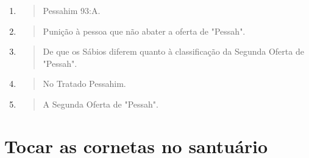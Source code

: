 \begin{enumerate}
\def\labelenumi{\arabic{enumi}.}
\setcounter{enumi}{77}
\item
 \begin{quote}
 Pessahim 93:A.
 \end{quote}
\item
 \begin{quote}
 Punição à pessoa que não abater a oferta de "Pessah".
 \end{quote}
\item
 \begin{quote}
 De que os Sábios diferem quanto à classificação da Segunda Oferta de
 "Pessah".
 \end{quote}
\item
 \begin{quote}
 No Tratado Pessahim.
 \end{quote}
\item
 \begin{quote}
 A Segunda Oferta de "Pessah".
 \end{quote}
\end{enumerate}


\section{Tocar as cornetas no santuário}


